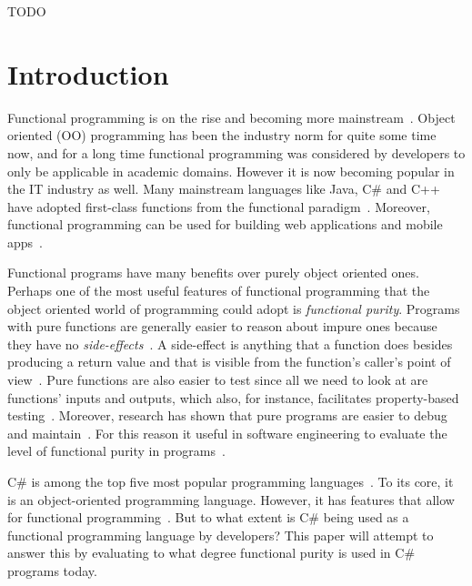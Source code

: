 \documentclass[a4paper,12pt]{article}
\begin{document}
\begin{sammanfattning}
  TODO
\end{sammanfattning}

\tableofcontents


\cleardoublepage

\mainmatter

\section{Introduction} \label{sec:Introduction}

Functional programming is on the rise and becoming more mainstream~\cite{intertech}. Object oriented (OO) programming has been the industry norm for quite some time now, and for a long time functional programming was considered by developers to only be applicable in academic domains. However it is now becoming popular in the IT industry as well. Many mainstream languages like Java, C\# and C++ have adopted first-class functions from the functional paradigm~\cite{intertech}. Moreover, functional programming can be used for building web applications and mobile apps~\cite{jonas-walter}.

Functional programs have many benefits over purely object oriented ones. Perhaps one of the most useful features of functional programming that the object oriented world of programming could adopt is \textit{functional purity}. Programs with pure functions are generally easier to reason about impure ones because they have no \textit{side-effects}~\cite{alvin-alexander}. A side-effect is anything that a function does besides producing a return value and that is visible from the function's caller's point of view~\cite{purity-in-javascript}. Pure functions are also easier to test since all we need to look at are functions' inputs and outputs, which also, for instance, facilitates property-based testing~\cite{alvin-alexander}. Moreover, research has shown that pure programs are easier to debug and maintain~\cite{purity-in-javascript}. %
For this reason it useful in software engineering to evaluate the level of functional purity in programs~\cite{purity-in-javascript}.

C\# is among the top five most popular programming languages~\cite{tiobe}. To its core, it is an object-oriented programming language. However, it has features that allow for functional programming~\cite{hamid-mosalla}. But to what extent is C\# being used as a functional programming language by developers? This paper will attempt to answer this by evaluating to what degree functional purity is used in C\# programs today.
\end{document}

